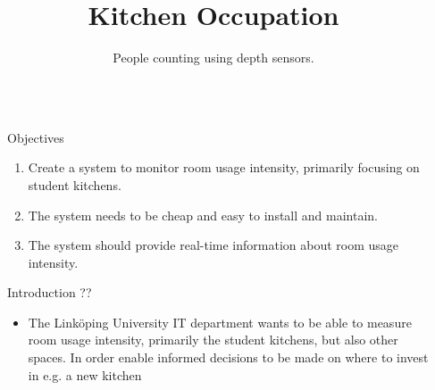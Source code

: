 \documentclass[final,hyperref={pdfpagelabels=false}]{beamer}
\title{\huge Kitchen Occupation} %
\author{People counting using depth sensors.} %
\institute{Department of Electrical Engineering, Linköping University} %
\begin{document}

\begin{frame}[t] %

\begin{columns}[t] %

\begin{column}{.02\textwidth}\end{column} %

\begin{column}{.465\textwidth} %


\begin{block}{Objectives}

\begin{enumerate}
\item Create a system to monitor room usage intensity, primarily focusing on student kitchens.
\item The system needs to be cheap and easy to install and maintain.
\item The system should provide real-time information about room usage intensity.
\end{enumerate}

\end{block}

            
\begin{block}{Introduction ??}

\begin{itemize}
\item The Linköping University IT department wants to be able to measure room usage intensity, primarily the student kitchens, but also other spaces. In order enable informed decisions to be made on where to invest in e.g. a new kitchen
\end{itemize}


\end{block}
\end{column}
\end{columns}
\end{frame}
\end{document}
